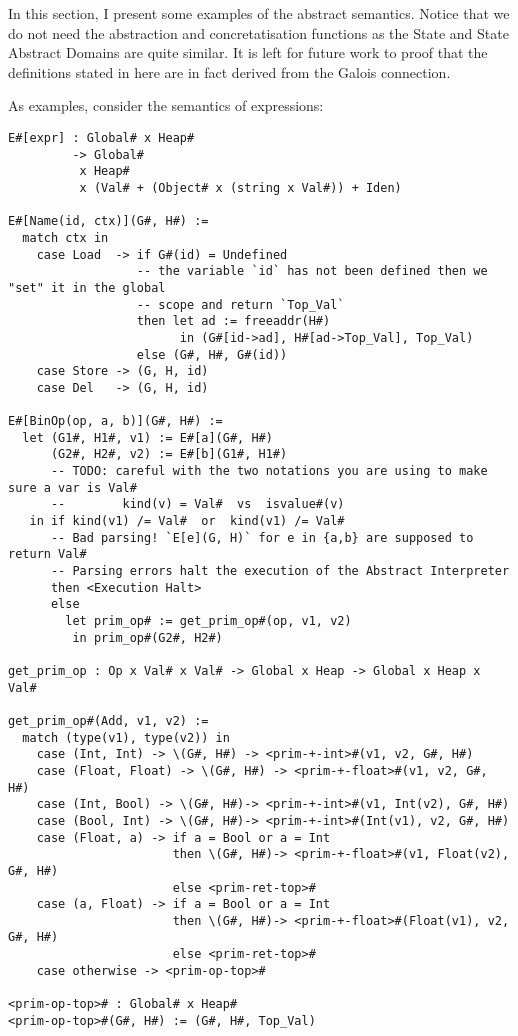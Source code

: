 In this section, I present some examples of the abstract semantics.
Notice that we do not need the abstraction and concretatisation
functions as the State and State Abstract Domains are quite similar. It
is left for future work to proof that the definitions stated in here are
in fact derived from the Galois connection.

As examples, consider the semantics of expressions:

\begin{verbatim}
E#[expr] : Global# x Heap#
         -> Global#
          x Heap#
          x (Val# + (Object# x (string x Val#)) + Iden)

E#[Name(id, ctx)](G#, H#) :=
  match ctx in
    case Load  -> if G#(id) = Undefined
                  -- the variable `id` has not been defined then we "set" it in the global
                  -- scope and return `Top_Val`
                  then let ad := freeaddr(H#)
                        in (G#[id->ad], H#[ad->Top_Val], Top_Val)
                  else (G#, H#, G#(id))
    case Store -> (G, H, id)
    case Del   -> (G, H, id)

E#[BinOp(op, a, b)](G#, H#) :=
  let (G1#, H1#, v1) := E#[a](G#, H#)
      (G2#, H2#, v2) := E#[b](G1#, H1#)
      -- TODO: careful with the two notations you are using to make sure a var is Val#
      --        kind(v) = Val#  vs  isvalue#(v)
   in if kind(v1) /= Val#  or  kind(v1) /= Val#
      -- Bad parsing! `E[e](G, H)` for e in {a,b} are supposed to return Val#
      -- Parsing errors halt the execution of the Abstract Interpreter
      then <Execution Halt>
      else
        let prim_op# := get_prim_op#(op, v1, v2)
         in prim_op#(G2#, H2#)

get_prim_op : Op x Val# x Val# -> Global x Heap -> Global x Heap x Val#

get_prim_op#(Add, v1, v2) :=
  match (type(v1), type(v2)) in
    case (Int, Int) -> \(G#, H#) -> <prim-+-int>#(v1, v2, G#, H#)
    case (Float, Float) -> \(G#, H#) -> <prim-+-float>#(v1, v2, G#, H#)
    case (Int, Bool) -> \(G#, H#)-> <prim-+-int>#(v1, Int(v2), G#, H#)
    case (Bool, Int) -> \(G#, H#)-> <prim-+-int>#(Int(v1), v2, G#, H#)
    case (Float, a) -> if a = Bool or a = Int
                       then \(G#, H#)-> <prim-+-float>#(v1, Float(v2), G#, H#)
                       else <prim-ret-top>#
    case (a, Float) -> if a = Bool or a = Int
                       then \(G#, H#)-> <prim-+-float>#(Float(v1), v2, G#, H#)
                       else <prim-ret-top>#
    case otherwise -> <prim-op-top>#

<prim-op-top># : Global# x Heap#
<prim-op-top>#(G#, H#) := (G#, H#, Top_Val)
\end{verbatim}

